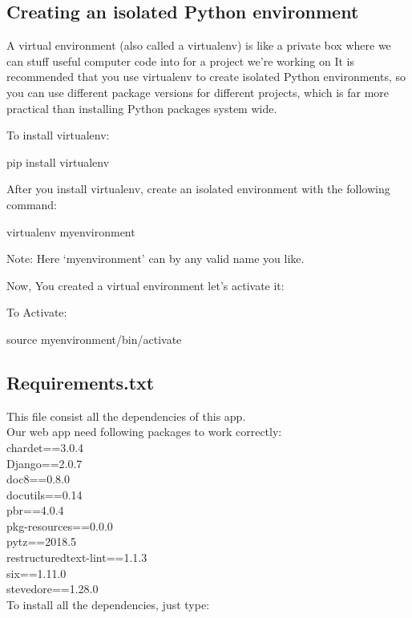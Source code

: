 \documentclass[12pt]{article}
\begin{document}
\subsection{Creating an isolated Python environment}
A virtual environment (also called a virtualenv) is like a private box where we can stuff useful computer code into for a project
we're working on It is recommended that you use virtualenv to create isolated Python environments, so you can use different package versions for different projects, which is far more practical than installing Python packages system wide.

To install virtualenv:
\begin{center}
pip install virtualenv
\end{center}
    

After you install virtualenv, create an isolated environment with the following command:

\begin{center}
virtualenv myenvironment
\end{center}

    

Note: Here `myenvironment' can by any valid name you like.

Now, You created a virtual environment let's activate it:

To Activate:
\begin{center}
source myenvironment/bin/activate
\end{center}

\subsection{Requirements.txt}
This file consist all the dependencies of this app.\\
Our web app need following packages to work correctly:\\
chardet==3.0.4\\
Django==2.0.7\\
doc8==0.8.0\\
docutils==0.14\\
pbr==4.0.4\\
pkg-resources==0.0.0\\
pytz==2018.5\\
restructuredtext-lint==1.1.3\\
six==1.11.0\\
stevedore==1.28.0\\

To install all the dependencies, just type:
\end{document}
